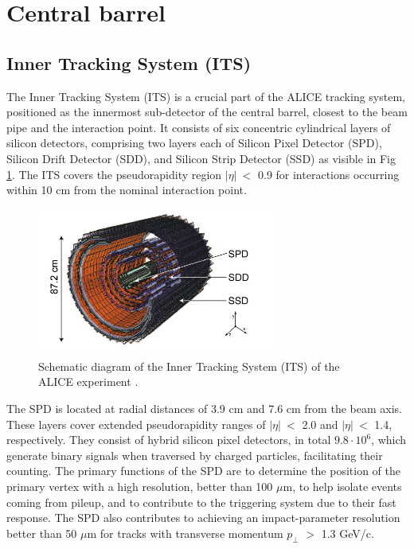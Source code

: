 \documentclass[12pt,a4paper]{book}
\begin{document}
\FloatBarrier	
\section{Central barrel}
\subsection{Inner Tracking System (ITS)}

 The Inner Tracking System (ITS) is a crucial part of the ALICE tracking system, positioned as the innermost sub-detector of the central barrel, closest to the beam pipe and the interaction point. It consists of six concentric cylindrical layers of silicon detectors, comprising two layers each of Silicon Pixel Detector (SPD), Silicon Drift Detector (SDD), and Silicon Strip Detector (SSD) as visible in Fig \ref{fig:ITS_schematic}. The ITS covers the pseudorapidity region $|\eta|\ <$ 0.9 for interactions occurring within 10 cm from the nominal interaction point.
\begin{figure}[h]
	\centering
	\includegraphics[width=0.7\textwidth]{pictures/ITS_schematic.png}
	\caption{Schematic diagram of the Inner Tracking System (ITS) of the ALICE experiment \cite{collaboration_2010}.}
	\label{fig:ITS_schematic}
\end{figure}
The  SPD is located at radial distances of 3.9 cm and 7.6 cm from the beam axis. These layers cover extended pseudorapidity ranges of $|\eta|\ <$ 2.0 and $|\eta|\ <$ 1.4, respectively. They consist of hybrid silicon pixel detectors, in total $9.8 \cdot 10^6$, which generate binary signals when traversed by charged particles, facilitating their counting. The primary functions of the SPD are to determine the position of the primary vertex with a high resolution, better than 100 $\mu$m, to help isolate events coming from pileup, and to contribute to the triggering system due to their fast response. The SPD also contributes to achieving an impact-parameter resolution better than 50 $\mu$m for tracks with transverse momentum $p_\perp$ $>$ 1.3 GeV/c.
\end{document}

